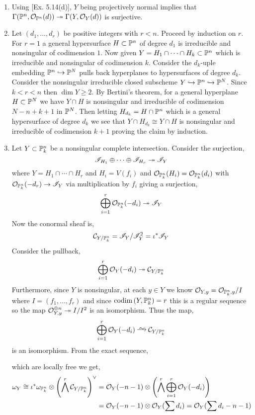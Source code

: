 \documentclass[12pt]{article}
\begin{document}
\begin{enumerate}
\item Using [Ex. 5.14(d)], $Y$ being projectively normal implies that $\Gamma(\P^n, \struct{\P^n}(d)) \onto \Gamma(Y, \struct{Y}(d))$ is surjective.

\item Let $(d_1, \dots, d_r)$ be positive integers with $r < n$. Proceed by induction on $r$. For $r = 1$ a general hypersurface $H \subset \P^n$ of degree $d_1$ is irreducible and nonsingular of codimension $1$. Now given $Y = H_1 \cap \cdots \cap H_{k} \subset \P^n$ which is irreducible and nonsingular of codimension $k$. Consider the $d_k$-uple embedding $\P^n \embed \P^{N}$ pulls back hyperplanes to hypersurfaces of degree $d_k$. Consider the nonsingular irreducible closed subscheme $Y \embed \P^n \embed \P^N$. Since $k < r < n$ then $\dim{Y} \ge 2$. By Bertini's theorem, for a general hyperplane $H \subset \P^N$ we have $Y \cap H$ is nonsingular and irreducible of codimension $N - n + k + 1$ in $\P^N$. Then letting $H_{d_k} = H \cap \P^n$ which is a general hypersurface of degree $d_k$ we see that $Y \cap H_{d_k} \cong Y \cap H$ is nonsingular and irreducible of codimension $k + 1$ proving the claim by induction. 

\item Let $Y \subset \P^n_k$ be a nonsingular complete intersection. Consider the surjection, 
\[ \I_{H_1} \oplus \cdots \oplus \I_{H_r} \onto \I_Y \]
where $Y = H_1 \cap \cdots \cap H_r$ and $H_i = V(f_i)$ and $\struct{\P^n_k}(H_i) = \struct{\P^n_k}(d_i)$ with $\struct{\P^n_k}(-d_r) \to \I_Y$ via multiplication by $f_i$ giving a surjection,
\[ \bigoplus_{i = 1}^r \struct{\P^n_k}(-d_i) \onto \I_Y \]
Now the conormal sheaf is,
\[ \C_{Y/\P^n_k} = \I_Y / \I_Y^2 = \iota^* \I_Y \]
Consider the pullback,
\[ \bigoplus_{i = 1}^r \struct{Y}(-d_i) \onto \C_{Y/\P^n_k} \]
Furthermore, since $Y$ is nonsingular, at each $y \in Y$ we know $\stalk{Y}{y} = \stalk{\P^n_k}{y} / I$ where $I = (f_1, \dots, f_r)$ and since $\codim{Y, \P^n_k} = r$ this is a regular sequence so the map $\stalk{Y}{y}^{\oplus n} \onto I/I^2$ is an isomorphism. Thus the map,
\[ \bigoplus_{i = 1}^r \struct{Y}(-d_i) \iso \C_{Y/\P^n_k} \]
is an isomorphism. From the exact sequence,
\begin{center}
\end{center}
which are locally free we get,
\begin{align*}
\omega_Y \cong \iota^* \omega_{\P^n_k} \otimes \left( \bigwedge^r \C_{Y/\P^n_k} \right)^\vee & = \struct{Y}(-n-1) \otimes \left( \bigwedge^r \bigoplus_{i = 1}^r \struct{Y}(-d_i) \right)
\\
& = \struct{Y}(-n-1) \otimes \struct{Y}(\sum d_i) = \struct{Y}(\sum d_i - n - 1)
\end{align*}


\end{enumerate}
\end{document}
